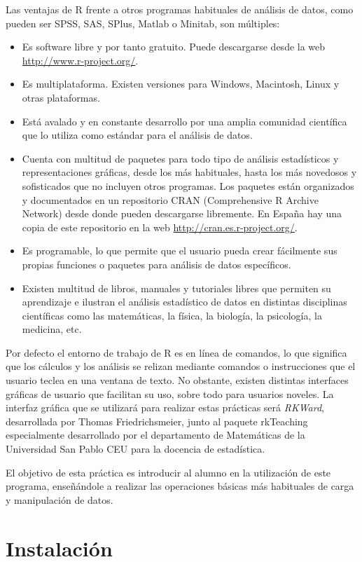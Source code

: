 Las ventajas de R frente a otros programas habituales de análisis de datos, como pueden ser SPSS, SAS, SPlus, Matlab o
Minitab, son múltiples:
\begin{itemize}
\item Es software libre y por tanto gratuito. Puede descargarse desde la web 
\url{http://www.r-project.org/}.
\item Es multiplataforma. Existen versiones para Windows, Macintosh, Linux y otras plataformas.
\item Está avalado y en constante desarrollo por una amplia comunidad científica que lo utiliza como estándar para el
análisis de datos.
\item Cuenta con multitud de paquetes para todo tipo de análisis estadísticos y representaciones gráficas, desde los más
habituales, hasta los más novedosos y sofisticados que no incluyen otros programas. Los paquetes están organizados y
documentados en un repositorio CRAN (Comprehensive R Archive Network) desde donde pueden descargarse libremente. En
España hay una copia de este repositorio en la web \url{http://cran.es.r-project.org/}.
\item Es programable, lo que permite que el usuario pueda crear fácilmente sus propias funciones o paquetes para
análisis de datos específicos.
\item Existen multitud de libros, manuales y tutoriales libres que permiten su aprendizaje e ilustran el análisis
estadístico de datos en distintas disciplinas científicas como las matemáticas, la física, la biología, la psicología, la medicina,
etc.
\end{itemize}

Por defecto el entorno de trabajo de R es en línea de comandos, lo que significa que los cálculos y los análisis se
relizan mediante comandos o instrucciones que el usuario teclea en una ventana de texto. No obstante, existen distintas
interfaces gráficas de usuario que facilitan su uso, sobre todo para usuarios noveles.
La interfaz gráfica que se utilizará para realizar estas prácticas será \emph{RKWard}, desarrollada por Thomas
Friedrichsmeier, junto al paquete rkTeaching especialmente desarrollado por el departamento de Matemáticas de la
Universidad San Pablo CEU para la docencia de estadística.

El objetivo de esta práctica es introducir al alumno en la utilización de este programa, enseñándole a realizar las
operaciones básicas más habituales de carga y manipulación de datos.

\section{Instalación}
